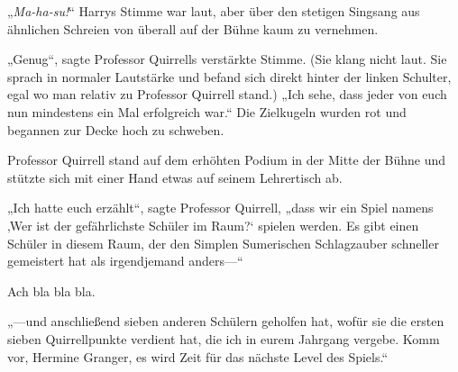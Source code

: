 „\emph{Ma-ha-su!}“ Harrys Stimme war laut, aber über den stetigen Singsang aus ähnlichen Schreien von überall auf der Bühne kaum zu vernehmen.

„Genug“, sagte Professor Quirrells verstärkte Stimme. (Sie klang nicht laut. Sie sprach in normaler Lautstärke und befand sich direkt hinter der linken Schulter, egal wo man relativ zu Professor Quirrell stand.) „Ich sehe, dass jeder von euch nun mindestens ein Mal erfolgreich war.“ Die Zielkugeln wurden rot und begannen zur Decke hoch zu schweben.

Professor Quirrell stand auf dem erhöhten Podium in der Mitte der Bühne und stützte sich mit einer Hand etwas auf seinem Lehrertisch ab.

„Ich hatte euch erzählt“, sagte Professor Quirrell, „dass wir ein Spiel namens ‚Wer ist der gefährlichste Schüler im Raum?‘ spielen werden. Es gibt einen Schüler in diesem Raum, der den Simplen Sumerischen Schlagzauber schneller gemeistert hat als irgendjemand anders—“

Ach bla bla bla.

„—und anschließend sieben anderen Schülern geholfen hat, wofür sie die ersten sieben Quirrellpunkte verdient hat, die ich in eurem Jahrgang vergebe. Komm vor, Hermine Granger, es wird Zeit für das nächste Level des Spiels.“

